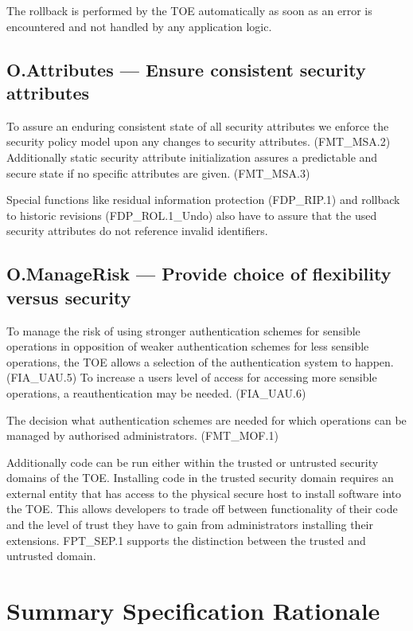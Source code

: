 \documentclass[12pt,english]{scrbook}
\begin{document}
    The rollback is performed by the TOE automatically as soon as an error is
    encountered and not handled by any application logic.

\subsection{O.Attributes --- Ensure consistent security attributes}

    To assure an enduring consistent state of all security attributes we
    enforce the security policy model upon any changes to security attributes.
    (FMT\_MSA.2) Additionally static security attribute initialization assures
    a predictable and secure state if no specific attributes are given.
    (FMT\_MSA.3)

    Special functions like residual information protection (FDP\_RIP.1) and
    rollback to historic revisions (FDP\_ROL.1\_Undo) also have to assure that
    the used security attributes do not reference invalid identifiers. 
    
\subsection{O.ManageRisk --- Provide choice of flexibility versus security}

    To manage the risk of using stronger authentication schemes for sensible
    operations in opposition of weaker authentication schemes for less sensible
    operations, the TOE allows a selection of the authentication system to
    happen. (FIA\_UAU.5) To increase a users level of access for accessing more
    sensible operations, a reauthentication may be needed. (FIA\_UAU.6)
    
    The decision what authentication schemes are needed for which operations
    can be managed by authorised administrators. (FMT\_MOF.1)

    Additionally code can be run either within the trusted or untrusted
    security domains of the TOE. Installing code in the trusted security domain
    requires an external entity that has access to the physical secure host to
    install software into the TOE. This allows developers to trade off between
    functionality of their code and the level of trust they have to gain from
    administrators installing their extensions. FPT\_SEP.1 supports the
    distinction between the trusted and untrusted domain.

\section{Summary Specification Rationale}
\end{document}
